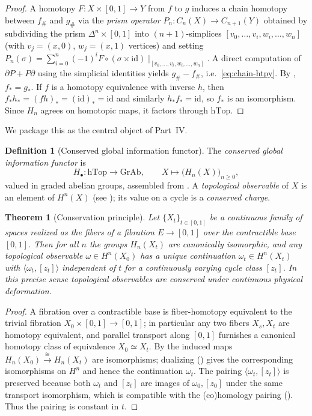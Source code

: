 \documentclass[12pt]{article}
\newtheorem{theorem}{Theorem}[section]
\theoremstyle{definition}
\newtheorem{definition}[definition]{Definition}
\theoremstyle{remark}
\newcommand{\hTop}{\mathrm{hTop}}
\newcommand{\GrAb}{\mathrm{GrAb}}
\newcommand{\id}{\mathrm{id}}
\begin{document}
\begin{proof}
A homotopy $F\colon X\times[0,1]\to Y$ from $f$ to $g$ induces a chain homotopy
between $f_\#$ and $g_\#$ via the \emph{prism operator}
$P_n\colon C_n(X)\to C_{n+1}(Y)$ obtained by subdividing the prism
$\Delta^n\times[0,1]$ into $(n+1)$-simplices $[v_0,\dots,v_i,w_i,\dots,w_n]$
(with $v_j=(x,0)$, $w_j=(x,1)$ vertices) and setting
$P_n(\sigma)=\sum_{i=0}^n(-1)^i F\circ(\sigma\times\id)\!\mid_{[v_0,\dots,v_i,w_i,\dots,w_n]}$.
A direct computation of $\partial P + P\partial$ using the simplicial identities
yields $g_\# - f_\#$, i.e.\ \eqref{eq:chain-htpy}. By
, $f_*=g_*$. If $f$ is a homotopy equivalence with
inverse $h$, then $f_*h_*=(fh)_*=(\id)_*=\id$ and similarly $h_*f_*=\id$, so
$f_*$ is an isomorphism. Since $H_n$ agrees on homotopic maps, it factors through
$\hTop$.
\end{proof}

We package this as the central object of Part~IV.

\begin{definition}[Conserved global information functor]
\label{def:cgi}
The \emph{conserved global information functor} is
\[
  H_\bullet \colon \hTop \longrightarrow \GrAb,
  \qquad X\longmapsto \bigl(H_n(X)\bigr)_{n\ge 0},
\]
valued in graded abelian groups, assembled from . A
\emph{topological observable} of $X$ is an element of $H^n(X)$ (see
); its value on a cycle is a \emph{conserved charge}.
\end{definition}

\begin{theorem}[Conservation principle]
\label{thm:cons-functor}
Let $\{X_t\}_{t\in[0,1]}$ be a continuous family of spaces realized as the fibers
of a fibration $E\to[0,1]$ over the contractible base $[0,1]$. Then for all $n$
the groups $H_n(X_t)$ are canonically isomorphic, and any topological observable
$\omega\in H^n(X_0)$ has a unique continuation $\omega_t\in H^n(X_t)$ with
$\langle\omega_t,[z_t]\rangle$ independent of $t$ for a continuously varying cycle
class $[z_t]$. In this precise sense topological observables are conserved under
continuous physical deformation.
\end{theorem}

\begin{proof}
A fibration over a contractible base is fiber-homotopy equivalent to the trivial
fibration $X_0\times[0,1]\to[0,1]$; in particular any two fibers $X_s,X_t$ are
homotopy equivalent, and parallel transport along $[0,1]$ furnishes a canonical
homotopy class of equivalence $X_0\simeq X_t$. By  the
induced maps $H_n(X_0)\xrightarrow{\ \cong\ }H_n(X_t)$ are isomorphisms;
dualizing () gives the corresponding isomorphisms on
$H^n$ and hence the continuation $\omega_t$. The pairing
$\langle\omega_t,[z_t]\rangle$ is preserved because both $\omega_t$ and $[z_t]$
are images of $\omega_0,[z_0]$ under the same transport isomorphism, which is
compatible with the (co)homology pairing (). Thus the pairing is
constant in $t$.
\end{proof}
\end{document}
